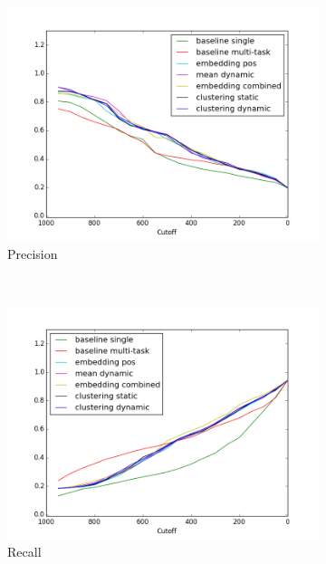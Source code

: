 \documentclass{article}
\begin{document}
\def \officialRunWidth {0.23\textwidth}
\begin{figure}[tb]
  \centering
    \begin{subfigure}[b]{\officialRunWidth}
            \includegraphics[width=\textwidth]{fig/microPrecision}
      \caption{Precision}
      \label{official:microprec}
    \end{subfigure}
    ~
    \begin{subfigure}[b]{\officialRunWidth}
            \includegraphics[width=\textwidth]{fig/microRecall}
      \caption{Recall}
      \label{official:microrecall}
    \end{subfigure}
    ~
    \begin{subfigure}[b]{\officialRunWidth}

\end{subfigure}
\end{figure}
\end{document}
